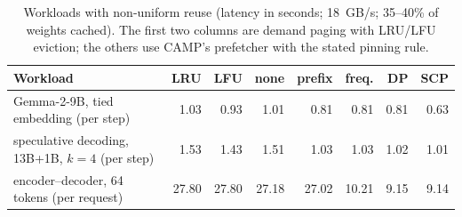 \begin{table}[t]
\centering
\caption{Workloads with non-uniform reuse (latency in seconds; 18~GB/s; 35--40\% of weights cached). The first two columns are demand paging with LRU/LFU eviction; the others use CAMP's prefetcher with the stated pinning rule.}
\label{tab:hetero}
\small
\begin{tabular}{lrrrrrrr}
\toprule
\textbf{Workload} & \textbf{LRU} & \textbf{LFU} & \textbf{none} & \textbf{prefix} & \textbf{freq.} & \textbf{DP} & \textbf{SCP}\\
\midrule
Gemma-2-9B, tied embedding (per step) & 1.03 & 0.93 & 1.01 & 0.81 & 0.81 & 0.81 & 0.63\\
speculative decoding, 13B+1B, $k{=}4$ (per step) & 1.53 & 1.43 & 1.51 & 1.03 & 1.03 & 1.02 & 1.01\\
encoder--decoder, 64 tokens (per request) & 27.80 & 27.80 & 27.18 & 27.02 & 10.21 & 9.15 & 9.14\\
\bottomrule
\end{tabular}
\end{table}
